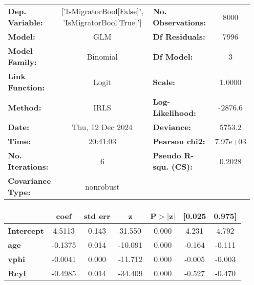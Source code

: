 \begin{center}
\begin{tabular}{lclc}
\toprule
\textbf{Dep. Variable:}   & ['IsMigratorBool[False]', 'IsMigratorBool[True]'] & \textbf{  No. Observations:  } &     8000    \\
\textbf{Model:}           &                        GLM                        & \textbf{  Df Residuals:      } &     7996    \\
\textbf{Model Family:}    &                      Binomial                     & \textbf{  Df Model:          } &        3    \\
\textbf{Link Function:}   &                       Logit                       & \textbf{  Scale:             } &    1.0000   \\
\textbf{Method:}          &                        IRLS                       & \textbf{  Log-Likelihood:    } &   -2876.6   \\
\textbf{Date:}            &                  Thu, 12 Dec 2024                 & \textbf{  Deviance:          } &    5753.2   \\
\textbf{Time:}            &                      20:41:03                     & \textbf{  Pearson chi2:      } &  7.97e+03   \\
\textbf{No. Iterations:}  &                         6                         & \textbf{  Pseudo R-squ. (CS):} &   0.2028    \\
\textbf{Covariance Type:} &                     nonrobust                     & \textbf{                     } &             \\
\bottomrule
\end{tabular}
\begin{tabular}{lcccccc}
                   & \textbf{coef} & \textbf{std err} & \textbf{z} & \textbf{P$> |$z$|$} & \textbf{[0.025} & \textbf{0.975]}  \\
\midrule
\textbf{Intercept} &       4.5113  &        0.143     &    31.550  &         0.000        &        4.231    &        4.792     \\
\textbf{age}       &      -0.1375  &        0.014     &   -10.091  &         0.000        &       -0.164    &       -0.111     \\
\textbf{vphi}      &      -0.0041  &        0.000     &   -11.712  &         0.000        &       -0.005    &       -0.003     \\
\textbf{Rcyl}      &      -0.4985  &        0.014     &   -34.409  &         0.000        &       -0.527    &       -0.470     \\
\bottomrule
\end{tabular}
\end{center}